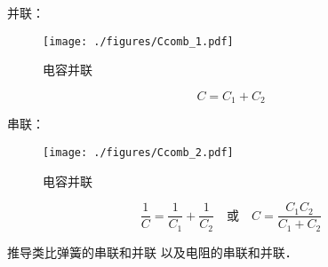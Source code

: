 

并联：
\begin{figure}[ht]
\centering
\texttt{[image: ./figures/Ccomb\_1.pdf]}
\caption{电容并联} \label{Ccomb_fig1}
\end{figure}
\begin{equation}
C = C_1 + C_2
\end{equation}

串联：
\begin{figure}[ht]
\centering
\texttt{[image: ./figures/Ccomb\_2.pdf]}
\caption{电容并联} \label{Ccomb_fig2}
\end{figure}
\begin{equation}
\frac{1}{C} = \frac{1}{C_1} + \frac{1}{C_2}
\quad \text{或} \quad
C = \frac{C_1C_2}{C_1 + C_2}
\end{equation}

推导类比弹簧的串联和并联 以及电阻的串联和并联．
